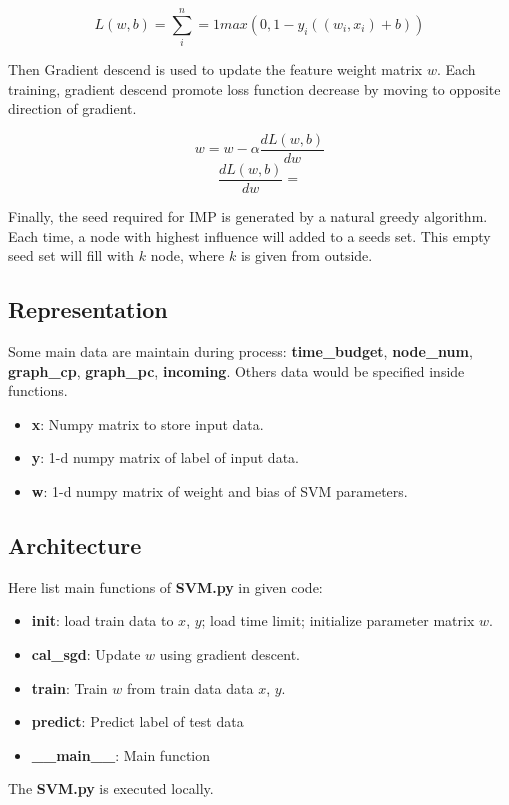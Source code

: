 \documentclass[conference,compsoc]{IEEEtran}
\begin{document}
$$ L(w,b)=\sum^n_i=1 max(0, 1-y_i((w_i, x_i)+b)) $$

Then Gradient descend is used to update the feature weight matrix $w$. Each
training, gradient descend promote loss function decrease by moving to
opposite direction of gradient.

$$ w = w -\alpha\frac{dL(w,b)}{dw}$$
$$ \frac{dL(w,b)}{dw} = $$


Finally, the seed required for IMP is generated by a natural greedy algorithm.
Each time, a node with highest influence will added to a seeds set. This empty
seed set will fill with $k$ node, where $k$ is given from outside.

\subsection{Representation}
Some main data are maintain during process: \textbf{time\_budget},
\textbf{node\_num}, \textbf{graph\_cp}, \textbf{graph\_pc}, \textbf{incoming}.
Others data would be specified inside functions.

\begin{itemize}
  \item \textbf{x}: Numpy matrix to store input data.
  \item \textbf{y}: 1-d numpy matrix of label of input data.
  \item \textbf{w}: 1-d numpy matrix of weight and bias of SVM parameters.
\end{itemize}


\subsection{Architecture}
Here list main functions of \textbf{SVM.py} in given code:
\begin{itemize}
    \item \textbf{init}: load train data to $x$, $y$; load time limit; initialize
	    parameter matrix $w$.
    \item \textbf{cal\_sgd}: Update $w$ using gradient descent.
    \item \textbf{train}: Train $w$ from train data data $x$, $y$.
    \item \textbf{predict}: Predict label of test data
    \item \textbf{\_\_main\_\_}: Main function
\end{itemize}

The \textbf{SVM.py} is executed locally.
\end{document}
